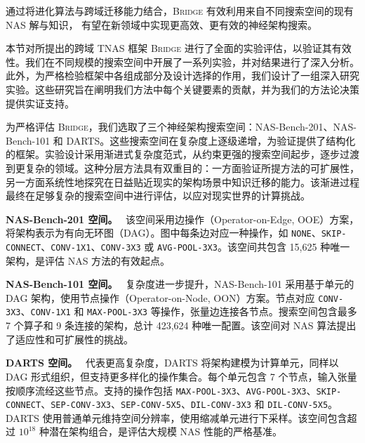 \documentclass[../main.tex]{subfiles}
\begin{document}
通过将进化算法与跨域迁移能力结合，\textsc{Bridge} 有效利用来自不同搜索空间的现有 NAS 解与知识，
有望在新领域中实现更高效、更有效的神经架构搜索。

\label{sec:ch4-experiment}

本节对所提出的跨域 TNAS 框架 \textsc{Bridge} 进行了全面的实验评估，以验证其有效性。我们在不同规模的搜索空间中开展了一系列实验，并对结果进行了深入分析。此外，为严格检验框架中各组成部分及设计选择的作用，我们设计了一组深入研究实验。这些研究旨在阐明我们方法中每个关键要素的贡献，并为我们的方法论决策提供实证支持。


为严格评估 \textsc{Bridge}，我们选取了三个神经架构搜索空间：NAS-Bench-201、NAS-Bench-101 和 DARTS。这些搜索空间在复杂度上逐级递增，为验证提供了结构化的框架。实验设计采用渐进式复杂度范式，从约束更强的搜索空间起步，逐步过渡到更复杂的领域。这种分层方法具有双重目的：一方面验证所提方法的可扩展性，另一方面系统性地探究在日益贴近现实的架构场景中知识迁移的能力。该渐进过程最终在足够复杂的搜索空间中进行评估，以应对现实世界的计算挑战。

\textbf{NAS-Bench-201 空间。}~\cite{DBLP:journals/pami/DongLMG22}
该空间采用边操作（Operator-on-Edge, OOE）方案，将架构表示为有向无环图（DAG）。图中每条边对应一种操作，如 \texttt{NONE}、\texttt{SKIP-CONNECT}、\texttt{CONV-1X1}、\texttt{CONV-3X3} 或 \texttt{AVG-POOL-3X3}。该空间共包含 15,625 种唯一架构，是评估 NAS 方法的有效起点。

\textbf{NAS-Bench-101 空间。}~\cite{DBLP:conf/icml/YingKCR0H19}
复杂度进一步提升，NAS-Bench-101 采用基于单元的 DAG 架构，使用节点操作（Operator-on-Node, OON）方案。节点对应 \texttt{CONV-3X3}、\texttt{CONV-1X1} 和 \texttt{MAX-POOL-3X3} 等操作，张量边连接各节点。搜索空间包含最多 7 个算子和 9 条连接的架构，总计 423,624 种唯一配置。该空间对 NAS 算法提出了适应性和可扩展性的挑战。

\textbf{DARTS 空间。}~\cite{DBLP:conf/iclr/LiuSY19}
代表更高复杂度，DARTS 将架构建模为计算单元，同样以 DAG 形式组织，但支持更多样化的操作集合。每个单元包含 7 个节点，输入张量按顺序流经这些节点。支持的操作包括 \texttt{MAX-POOL-3X3}、\texttt{AVG-POOL-3X3}、\texttt{SKIP-CONNECT}、\texttt{SEP-CONV-3X3}、\texttt{SEP-CONV-5X5}、\texttt{DIL-CONV-3X3} 和 \texttt{DIL-CONV-5X5}。DARTS 使用普通单元维持空间分辨率，使用缩减单元进行下采样。该空间包含超过 $10^{18}$ 种潜在架构组合，是评估大规模 NAS 性能的严格基准。
\end{document}
